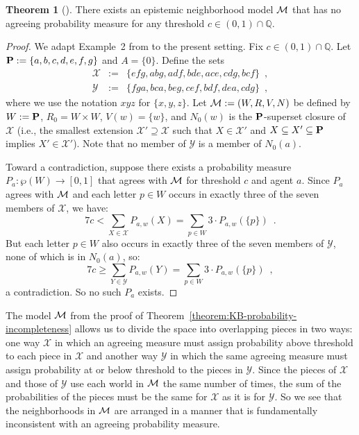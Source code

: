 \documentclass[12pt]{article}
\theoremstyle{definition}
\newtheorem{theorem}{Theorem}[section]
\newcommand{\Rat}{\mathbb{Q}}  %
\newcommand{\M}{{\cal M}}      %
\newcommand{\Prop}{{\bf P}}    %
\begin{document}
\begin{theorem}[\cite{WalleyFine1979:vomacp}]
  \label{theorem:walleyfine}
  There exists an epistemic neighborhood model $\M$ that has no
  agreeing probability measure for any threshold $c\in(0,1)\cap\Rat$.
\end{theorem}
\begin{proof}
  We adapt Example~2 from \cite[pp.~344-345]{WalleyFine1979:vomacp} to
  the present setting.  Fix $c\in(0,1)\cap\Rat$.  Let
  $\Prop:=\{a,b,c,d,e,f,g\}$ and $A=\{0\}$.  Define the sets
  \begin{eqnarray*}
    \mathcal{X} &:=&
    \{efg, abg, adf, bde, ace, cdg, bcf\}\enspace,
    \\
    \mathcal{Y} &:=&
    \{fga,bca,beg,cef,bdf,dea,cdg\}\enspace,
  \end{eqnarray*}
  where we use the notation $xyz$ for $\{x,y,z\}$. Let $\M:=(W,R,V,N)$
  be defined by $W:=\Prop$, $R_0=W\times W$, $V(w)=\{w\}$, and
  $N_0(w)$ is the $\Prop$-superset closure of $\mathcal{X}$ (i.e., the
  smallest extension $\mathcal{X}'\supseteq\mathcal{X}$ such that
  $X\in\mathcal{X}'$ and $X\subseteq X'\subseteq\Prop$ implies $X'\in
  \mathcal{X}'$).  Note that no member of $\mathcal{Y}$ is a member of
  $N_0(a)$.
  
  Toward a contradiction, suppose there exists a probability measure
  $P_a:\wp(W)\to[0,1]$ that agrees with $\M$ for threshold $c$ and
  agent $a$.  Since $P_a$ agrees with $\M$ and each letter $p\in W$
  occurs in exactly three of the seven members of $\mathcal{X}$, we
  have:
  \[
  \textstyle 7c < \sum_{X\in\mathcal{X}}P_{a,w}(X)=\sum_{p\in W}3\cdot
  P_{a,w}(\{p\})\enspace.
  \]
  But each letter $p\in W$ also occurs in exactly three of the seven
  members of $\mathcal{Y}$, none of which is in $N_0(a)$, so:
  \[
  \textstyle 7c \geq \sum_{Y\in\mathcal{Y}}P_{a,w}(Y)=\sum_{p\in
    W}3\cdot P_{a,w}(\{p\})\enspace,
  \]
  a contradiction.  So no such $P_a$ exists.
\end{proof}

The model $\M$ from the proof of
Theorem~\ref{theorem:KB-probability-incompleteness} allows us to
divide the space into overlapping pieces in two ways: one way
$\mathcal{X}$ in which an agreeing measure must assign probability
above threshold to each piece in $\mathcal{X}$ and another way
$\mathcal{Y}$ in which the same agreeing measure must assign
probability at or below threshold to the pieces in $\mathcal{Y}$.
Since the pieces of $\mathcal{X}$ and those of $\mathcal{Y}$ use each
world in $\M$ the same number of times, the sum of the probabilities
of the pieces must be the same for $\mathcal{X}$ as it is for
$\mathcal{Y}$.  So we see that the neighborhoods in $\M$ are arranged
in a manner that is fundamentally inconsistent with an agreeing
probability measure.
\end{document}
